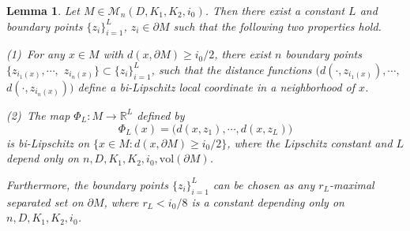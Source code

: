 \documentclass[11pt,letterpaper]{amsart}
\numberwithin{equation}{section}
\theoremstyle{definition}
\theoremstyle{plain}
\theoremstyle{definition}
\theoremstyle{plain}
\newtheorem{coordinate}[volume]{Lemma}
\theoremstyle{definition}
\theoremstyle{plain}
\newcommand{\vol}{\textrm{vol}}
\begin{document}
\begin{coordinate}\label{coordinate}
Let $M\in \mathcal{M}_n(D,K_1,K_2,i_0)$. Then there exist a constant $L$ and boundary points $\{z_i\}_{i=1}^L$, $z_i\in \partial M$ such that the following two properties hold.

\noindent (1) \,For any $x\in M$ with $d(x,\partial M)\geqslant i_0/2$, there exist $n$ boundary points $\{z_{i_1(x)},\cdots,$ $z_{i_n(x)}\}\subset \{z_i\}_{i=1}^L$, such that the distance functions $\big(d(\cdot,z_{i_1(x)}),\cdots,$ $d(\cdot,z_{i_n(x)})\big)$ define a bi-Lipschitz local coordinate in a neighborhood of $x$.

\noindent (2) \,The map $\Phi_L:M\to \mathbb{R}^{L}$ defined by 
$$\Phi_L(x)=\big(d(x,z_1),\cdots,d(x,z_L)\big)$$ 
is bi-Lipschitz on $\{x\in M: d(x,\partial M)\geqslant i_0/2\}$, where the Lipschitz constant and $L$ depend only on $n,D,K_1,K_2,i_0,\vol(\partial M)$. 

\smallskip
Furthermore, the boundary points $\{z_i\}_{i=1}^L$ can be chosen as any $r_L$-maximal separated set on $\partial M$, where $r_L<i_0/8$ is a constant depending only on $n,D,K_1,K_2,i_0$.
\end{coordinate}
\end{document}
